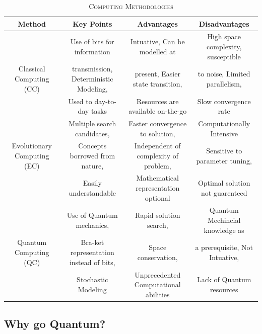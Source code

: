 \documentclass[conference]{IEEEtran}
\newcommand\sufr[3][0pt]{$\rule{0pt}{\dimexpr#1+1.4ex\relax}^\frac{#2}{#3}$}
\begin{document}
\begin{table}[!t]
\caption{\textsc{Computing Methodologies}}
\label{tab:1}
\centering
{
\begin{tabular}{| c | c | c | c |}
\hline
\textbf{Method} & \textbf{Key Points} & \textbf{Advantages} & \textbf{Disadvantages} \\
\hline
& Use of bits for information & Intuative, Can be modelled at & High space complexity, susceptible\\
Classical Computing (CC)&transmission, Deterministic Modeling, &present, Easier state transition,& to noise, Limited parallelism,\\
&Used to day-to-day tasks& Resources are available on-the-go & Slow convergence rate\\
\hline
& Multiple search candidates, & Faster convergence to solution, & Computationally Intensive \\
Evolutionary Computing (EC)& Concepts borrowed from nature,& Independent of complexity of problem,& Sensitive to parameter tuning,\\
&Easily understandable&Mathematical representation optional& Optimal solution not guarenteed\\
\hline
& Use of Quantum mechanics, & Rapid solution search, & Quantum Mechincial knowledge as \\
Quantum Computing (QC)& Bra-ket representation instead of bits, & Space conservation, & a prerequisite, Not Intuative, \\
&Stochastic Modeling&Unprecedented Computational abilities&Lack of Quantum resources\\
\hline
\end{tabular}
}
\end{table}

\subsection{Why go Quantum?}

\end{document}
